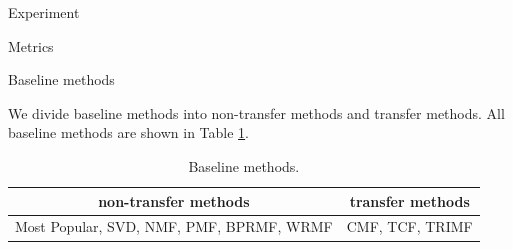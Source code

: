 \begin{section}{Experiment}
\begin{subsection}{Metrics}
  
\end{subsection}

\begin{subsection}{Baseline methods}  

We divide baseline methods into non-transfer methods and transfer methods. All baseline methods are shown in Table \ref{baseline}.
\begin{table}

\begin{center}
  \begin{tabular}{|c|c|}
    \hline
    non-transfer methods & transfer methods\\
    \hline
    Most Popular, SVD, NMF, PMF, BPRMF, WRMF&CMF, TCF, TRIMF\\
\hline
  \end{tabular}
\end{center}
\caption{Baseline methods.}
\label{baseline}


\end{table}

\end{subsection}
\end{section}
